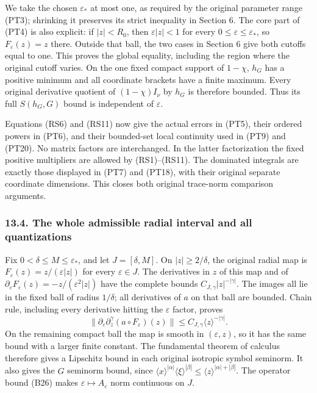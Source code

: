 \documentclass[
  11pt,
]{article}
\begin{document}
We take the chosen \(\varepsilon_*\) at most one, as required by the
original parameter range (PT3); shrinking it preserves its strict
inequality in Section 6. The core part of (PT4) is also explicit: if
\(|z|<R_0\), then \(\varepsilon|z|<1\) for every
\(0\leq\varepsilon\leq\varepsilon_*\), so \(F_\varepsilon(z)=z\) there.
Outside that ball, the two cases in Section 6 give both cutoffs equal to
one. This proves the global equality, including the region where the
original cutoff varies. On the one fixed compact support of \(1-\chi\),
\(h_G\) has a positive minimum and all coordinate brackets have a finite
maximum. Every original derivative quotient of \((1-\chi)I_\nu\) by
\(h_G\) is therefore bounded. Thus its full \(S(h_G,G)\) bound is
independent of \(\varepsilon\).

Equations (RS6) and (RS11) now give the actual errors in (PT5), their
ordered powers in (PT6), and their bounded-set local continuity used in
(PT9) and (PT20). No matrix factors are interchanged. In the latter
factorization the fixed positive multipliers are allowed by
(RS1)--(RS11). The dominated integrals are exactly those displayed in
(PT7) and (PT18), with their original separate coordinate dimensions.
This closes both original trace-norm comparison arguments.

\subsubsection{13.4. The whole admissible radial interval and all
quantizations}\label{the-whole-admissible-radial-interval-and-all-quantizations}

Fix \(0<\delta\leq M\leq\varepsilon_*\), and let \(J=[\delta,M]\). On
\(|z|\geq2/\delta\), the original radial map is
\(F_\varepsilon(z)=z/(\varepsilon|z|)\) for every \(\varepsilon\in J\).
The derivatives in \(z\) of this map and of
\(\partial_\varepsilon F_\varepsilon(z)=-z/(\varepsilon^2|z|)\) have the
complete bounds \(C_{J,\gamma}|z|^{-|\gamma|}\). The images all lie in
the fixed ball of radius \(1/\delta\); all derivatives of \(a\) on that
ball are bounded. Chain rule, including every derivative hitting the
\(\varepsilon\) factor, proves \[
 \|\partial_\varepsilon\partial_z^\gamma
                   (a\circ F_\varepsilon)(z)\|
       \leq C_{J,\gamma}\langle z\rangle^{-|\gamma|}.
 \tag{RS13}
\] On the remaining compact ball the map is smooth in
\((\varepsilon,z)\), so it has the same bound with a larger finite
constant. The fundamental theorem of calculus therefore gives a
Lipschitz bound in each original isotropic symbol seminorm. It also
gives the \(G\) seminorm bound, since
\(\langle x\rangle^{|\alpha|}\langle\xi\rangle^{|\beta|}
\leq\langle z\rangle^{|\alpha|+|\beta|}\). The operator bound (B26)
makes \(\varepsilon\mapsto A_\varepsilon\) norm continuous on \(J\).
\end{document}
